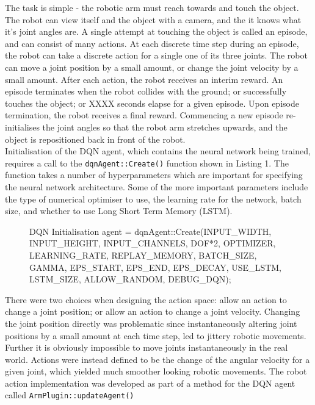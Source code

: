 \documentclass[a4paper]{article}
\begin{document}
The task is simple - the robotic arm must reach towards and touch the object. The robot can view itself and the object with a camera, and the it knows what it's joint angles are. A single attempt at touching the object is called an episode, and can consist of many actions. At each discrete time step during an episode, the robot can take a discrete action for a single one of its three joints. The robot can move a joint position by a small amount, or change the joint velocity by a small amount. After each action, the robot receives an interim reward. An episode terminates when the robot collides with the ground; or successfully touches the object; or XXXX seconds elapse for a given episode. Upon episode termination, the robot receives a final reward. Commencing a new episode re-initialises the joint angles so that the robot arm stretches upwards, and the object is repositioned back in front of the robot.\\

Initialisation of the DQN agent, which contains the neural network being trained, requires a call to the \texttt{dqnAgent::Create()} function shown in Listing 1. The function takes a number of hyperparameters which are important for specifying the neural network architecture. Some of the more important parameters include the type of numerical optimiser to use, the learning rate for the network, batch size, and whether to use Long Short Term Memory (LSTM).

\begin{figure}[h]\scriptsize
\begin{sexylisting}{DQN Initialisation}
agent = dqnAgent::Create(INPUT_WIDTH, INPUT_HEIGHT, INPUT_CHANNELS, DOF*2,
			 OPTIMIZER, LEARNING_RATE, REPLAY_MEMORY, BATCH_SIZE, 
		  	 GAMMA, EPS_START, EPS_END, EPS_DECAY, 
		  	 USE_LSTM, LSTM_SIZE, ALLOW_RANDOM, DEBUG_DQN);
\end{sexylisting}
\end{figure}

\newpage

There were two choices when designing the action space: allow an action to change a joint position; or allow an action to change a joint velocity. Changing the joint position directly was problematic since instantaneously altering joint positions by a small amount at each time step, led to  jittery robotic movements. Further it is obviously impossible to move joints instantaneously in the real world. Actions were instead defined to be the change of the angular velocity for a given joint, which yielded much smoother looking robotic movements. The robot action implementation was developed as part of a method for the DQN agent called \texttt{ArmPlugin::updateAgent()}
\end{document}
